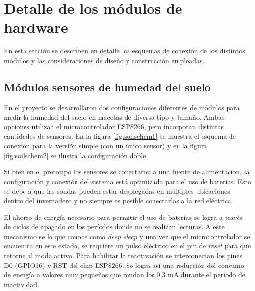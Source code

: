 \section{Detalle de los módulos de hardware}
\label{sec:Módulos de hardware}
En esta sección se describen en detalle los esquemas de conexión de los distintos módulos y las consideraciones de diseño y construcción empleadas. 

\subsection{Módulos sensores de humedad del suelo}
\label{Módulos sensores de humedad del suelo}


En el proyecto se desarrollaron dos configuraciones diferentes de módulos para medir la humedad del suelo en macetas de diverso tipo y tamaño. Ambas opciones utilizan el microcontrolador ESP8266, pero incorporan distintas cantidades de sensores. En la figura \ref{fig:soilschem1} se muestra el esquema de conexión para la versión simple (con un único sensor) y en la figura \ref{fig:soilschem2} se ilustra la configuración doble.

Si bien en el prototipo los sensores se conectaron a una fuente de alimentación, la configuración y conexión del sistema está optimizada para el uso de baterías. Esto se debe a que las sondas pueden estar desplegadas en múltiples ubicaciones dentro del invernadero y no siempre es posible conectarlas a la red eléctrica. 

El ahorro de energía necesario para permitir el uso de  baterías se logra a través de ciclos de apagado en los períodos donde no se realizan lecturas. A este mecanismo se lo que conoce como \textit{deep sleep} y una vez que el microcontrolador se encuentra en este estado, se requiere un pulso eléctrico en el pin de \textit{reset} para que retorne al modo activo. 
Para habilitar la reactivación se interconectan los pines D0 (GPIO16) y RST del chip ESP8266. Se logra así una reducción del consumo de energía a valores muy pequeños que rondan los 0,3 mA durante el período de inactividad.




